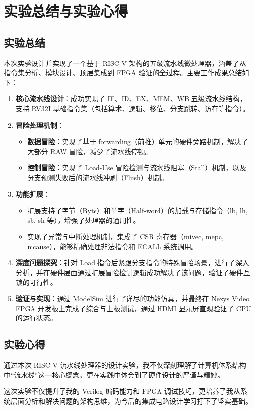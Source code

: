 \documentclass[12pt,a4paper]{article}
\begin{document}
\clearpage
\section{实验总结与实验心得}

\subsection{实验总结}

本次实验设计并实现了一个基于 RISC-V 架构的五级流水线微处理器，涵盖了从指令集分析、模块设计、顶层集成到 FPGA 验证的全过程。主要工作成果总结如下：

\begin{enumerate}
    \item \textbf{核心流水线设计}：成功实现了 IF、ID、EX、MEM、WB 五级流水线结构，支持 RV32I 基础指令集（包括算术、逻辑、移位、分支跳转、访存等指令）。
    \item \textbf{冒险处理机制}：
    \begin{itemize}
        \item \textbf{数据冒险}：实现了基于 forwarding（前推）单元的硬件旁路机制，解决了大部分 RAW 冒险，减少了流水线停顿。
        \item \textbf{控制冒险}：实现了 Load-Use 冒险检测与流水线阻塞（Stall）机制，以及分支预测失败后的流水线冲刷（Flush）机制。
    \end{itemize}
    \item \textbf{功能扩展}：
    \begin{itemize}
        \item 扩展支持了字节（Byte）和半字（Half-word）的加载与存储指令（lb, lh, sb, sh 等），增强了处理器的通用性。
        \item 实现了异常与中断处理机制，集成了 CSR 寄存器（mtvec, mepc, mcause），能够精确处理非法指令和 ECALL 系统调用。
    \end{itemize}
    \item \textbf{深度问题探究}：针对 Load 指令后紧跟分支指令的特殊冒险场景，进行了深入分析，并在硬件层面通过扩展冒险检测逻辑成功解决了该问题，验证了硬件互锁的可行性。
    \item \textbf{验证与实现}：通过 ModelSim 进行了详尽的功能仿真，并最终在 Nexys Video FPGA 开发板上完成了综合与上板测试，通过 HDMI 显示屏直观验证了 CPU 的运行状态。
\end{enumerate}

\subsection{实验心得}

通过本次 RISC-V 流水线处理器的设计实验，我不仅深刻理解了计算机体系结构中“流水线”这一核心概念，更在实践中体会到了硬件设计的严谨与精妙。

这次实验不仅提升了我的 Verilog 编码能力和 FPGA 调试技巧，更培养了我从系统层面分析和解决问题的架构思维，为今后的集成电路设计学习打下了坚实基础。
\end{document}
